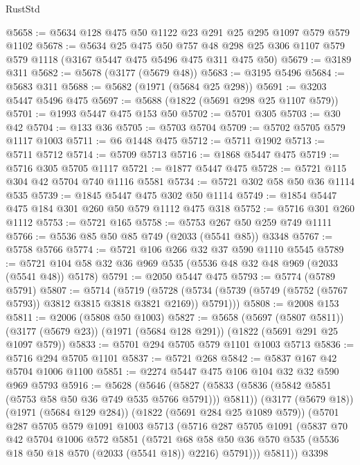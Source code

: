 \begin{lexlean}{RustStd}
\begin{coremodule}
{\begin{coremodule}
{{{{{{{{{{{{{@5658 := @5634 @128 @475 @50 @1122 @23 @291 @25 @295 @1097 @579 @579 @1102
@5678 := @5634
    @25
    @475
    @50
    @757
    @48
    @298
    @25
    @306
    @1107
    @579
    @579
    @1118
    (@3167 @5447 @475 @5496 @475 @311 @475 @50)
@5679 := @3189 @311
@5682 := @5678 (@3177 (@5679 @48))
@5683 := @3195 @5496
@5684 := @5683 @311
@5688 := @5682 (@1971 (@5684 @25 @298))
@5691 := @3203 @5447 @5496 @475
@5697 := @5688 (@1822 (@5691 @298 @25 @1107 @579))
@5701 := @1993 @5447 @475 @153 @50
@5702 := @5701 @305
@5703 := @30 @42
@5704 := @133 @36
@5705 := @5703 @5704
@5709 := @5702 @5705 @579 @1117 @1003
@5711 := @6 @1448 @475
@5712 := @5711 @1902
@5713 := @5711 @5712
@5714 := @5709 @5713
@5716 := @1868 @5447 @475
@5719 := @5716 @305 @5705 @1117
@5721 := @1877 @5447 @475
@5728 := @5721 @115 @304 @42 @5704 @740 @1116 @5581
@5734 := @5721 @302 @58 @50 @36 @1114 @535
@5739 := @1845 @5447 @475 @302 @50 @1114
@5749 := @1854 @5447 @475 @184 @301 @260 @50 @579 @1112 @475 @318
@5752 := @5716 @301 @260 @1112
@5753 := @5721 @165
@5758 := @5753 @267 @50 @259 @749 @1111
@5766 := @5536 @85 @50 @85 @749 (@2033 (@5541 @85)) @3348
@5767 := @5758 @5766
@5774 := @5721 @106 @266 @32 @37 @590 @1110 @5545
@5789 := @5721 @104 @58 @32 @36 @969 @535 (@5536 @48 @32 @48 @969 (@2033 (@5541 @48)) @5178)
@5791 := @2050 @5447 @475
@5793 := @5774 (@5789 @5791)
@5807 := @5714
    (@5719
      (@5728 (@5734 (@5739 (@5749 (@5752 (@5767 @5793)) @3812 @3815 @3818 @3821 @2169)) @5791)))
@5808 := @2008 @153
@5811 := @2006 (@5808 @50 @1003)
@5827 := @5658
    (@5697 (@5807 @5811))
    (@3177 (@5679 @23))
    (@1971 (@5684 @128 @291))
    (@1822 (@5691 @291 @25 @1097 @579))
@5833 := @5701 @294 @5705 @579 @1101 @1003 @5713
@5836 := @5716 @294 @5705 @1101
@5837 := @5721 @268
@5842 := @5837 @167 @42 @5704 @1006 @1100
@5851 := @2274 @5447 @475 @106 @104 @32 @32 @590 @969 @5793
@5916 := @5628
    (@5646
      (@5827 (@5833 (@5836 (@5842 @5851 (@5753 @58 @50 @36 @749 @535 @5766 @5791))) @5811))
      (@3177 (@5679 @18))
      (@1971 (@5684 @129 @284))
      (@1822 (@5691 @284 @25 @1089 @579))
      (@5701
        @287
        @5705
        @579
        @1091
        @1003
        @5713
        (@5716
          @287
          @5705
          @1091
          (@5837
            @70
            @42
            @5704
            @1006
            @572
            @5851
            (@5721
              @68
              @58
              @50
              @36
              @570
              @535
              (@5536 @18 @50 @18 @570 (@2033 (@5541 @18)) @2216)
              @5791)))
        @5811))
    @3398
}}}}}}}}}}}}}
\end{coremodule}}
\end{coremodule}
\end{lexlean}
